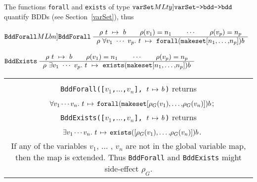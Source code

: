\documentclass[12pt]{article}
\newcommand{\bnind}[1]{\index[MLbn]{#1}}
\newcommand{\tyind}[1]{\index[MLty]{#1}}
\newlength{\minipagewidth}
\newcommand{\ty}[1]{\mbox{\tt #1}}
\newcommand{\ml}[1]{{\tt #1}}
\newcommand{\termbdd}[3]{\mbox{$#1~#2~\mapsto~#3$}}
\newcommand{\globtermbdd}[2]{\mbox{$#1\hspace{0.5mm}\mapsto\hspace{0.5mm}#2$}}
\newcommand\termbddty{\ty{term\_bdd}}
\newcommand\fun{\mbox{\tt{->}}}
\renewcommand{\prod}{\mbox{\tt{*}}}
\begin{document}
The functions \ml{forall}\bnind{\ml{forall}} and \ml{exists}\bnind{\ml{exists}} of type 
$\ty{varSet}\tyind{\ml{varSet}}\fun\ty{bdd}\fun\ty{bdd}$
quantify BDDs (see Section~\ref{varSet}), thus

\smallskip


$\ml{BddForall}\bnind{\ml{BddForall}}~\begin{array}{c}
\termbdd{\rho}{t}{b} \qquad \rho(v_1)=n_1 \qquad \cdots \qquad
   \rho(v_p)=n_p
\\ \hline
\termbdd{\rho}{\forall v_1~\cdots~v_p.~ t}%
{\ml{forall(makeset[}n_1\ml{,}\ldots\ml{,}n_p\ml{])}b}
\end{array}$


\smallskip


$\ml{BddExists}~\begin{array}{c}
\termbdd{\rho}{t}{b} \qquad \rho(v_1)=n_1 \qquad \cdots \qquad
   \rho(v_p)=n_p
\\ \hline
\termbdd{\rho}{\exists v_1~\cdots~v_p.~ t}%
{\ml{exists(makeset[}n_1\ml{,}\ldots\ml{,}n_p\ml{])}b}
\end{array}$


\vspace*{-4mm}
\begin{flushleft}
\begin{tabular}{|c|}\hline
\begin{minipage}{\minipagewidth}
\smallskip
\begin{footnotesize}
\begin{description}

\item $\ml{BddForall}\bnind{\ml{BddForall}}, \ml{BddExists}\bnind{\ml{BddExists}} : \ty{term list}\prod\termbddty\fun\termbddty$\\
\ml{BddForall([$v_1$,$\ldots$,$v_n$], $\globtermbdd{t}{b}$)} returns\\
\mbox{}~ $\globtermbdd{\forall v_1\cdots v_n.~t}{\ml{forall(makeset[}\rho_G(v_1)\ml{,}\ldots\ml{,}\rho_G(v_n)\ml{])} b}$;\\
\ml{BddExists([$v_1$,$\ldots$,$v_n$], $\globtermbdd{t}{b}$)} returns\\
\mbox{}~ $\globtermbdd{\exists v_1\cdots v_n.~t}{\ml{exists([}\rho_G(v_1)\ml{,}\ldots\ml{,}\rho_G(v_n)\ml{])} b}$.\\
If any of the variables $v_1$, $\ldots$ , $v_n$ are not in the global variable map, then the map
is extended. Thus \ml{BddForall} and \ml{BddExists} might side-effect $\rho_G$.



\end{description}
\end{footnotesize}
\smallskip
\end{minipage}\\ \hline
\end{tabular}
\end{flushleft}
\smallskip
\end{document}
